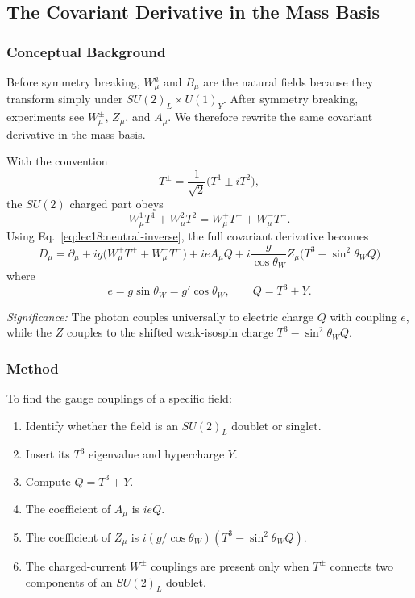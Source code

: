 \subsection{The Covariant Derivative in the Mass Basis}\label{subsec:lec18:covariant-derivative-mass-basis}

\subsubsection*{Conceptual Background}

Before symmetry breaking, $W^a_\mu$ and $B_\mu$ are the natural fields because
they transform simply under $SU(2)_L\times U(1)_Y$. After symmetry breaking,
experiments see $W^\pm_\mu$, $Z_\mu$, and $A_\mu$. We therefore rewrite the
same covariant derivative in the mass basis.

With the convention
\begin{equation}
  T^\pm=\frac{1}{\sqrt2}\big(T^1\pm iT^2\big),
  \label{eq:lec18:tpm-definition}
\end{equation}
the $SU(2)$ charged part obeys
\begin{equation}
  W^1_\mu T^1+W^2_\mu T^2=W^+_\mu T^+ + W^-_\mu T^- .
  \label{eq:lec18:charged-generator-identity}
\end{equation}
Using Eq.~\eqref{eq:lec18:neutral-inverse}, the full covariant derivative becomes
\begin{equation}
  \boxed{\;
  D_\mu=\partial_\mu
  +ig\big(W^+_\mu T^+ + W^-_\mu T^-\big)
  +ieA_\mu Q
  +i\frac{g}{\cos\theta_W}Z_\mu\big(T^3-\sin^2\theta_W Q\big)\;}
  \label{eq:lec18:covariant-derivative-mass-basis}
\end{equation}
where
\begin{equation}
  \boxed{\;e=g\sin\theta_W=g'\cos\theta_W,
  \qquad Q=T^3+Y .\;}
  \label{eq:lec18:e-charge-relation}
\end{equation}

\textit{Significance:} The photon couples universally to electric charge $Q$ with coupling $e$, while the $Z$ couples to the shifted weak-isospin charge $T^3-\sin^2\theta_W Q$.

\subsubsection*{Method}

To find the gauge couplings of a specific field:
\begin{enumerate}
  \item Identify whether the field is an $SU(2)_L$ doublet or singlet.
  \item Insert its $T^3$ eigenvalue and hypercharge $Y$.
  \item Compute $Q=T^3+Y$.
  \item The coefficient of $A_\mu$ is $ieQ$.
  \item The coefficient of $Z_\mu$ is $i(g/\cos\theta_W)(T^3-\sin^2\theta_W Q)$.
  \item The charged-current $W^\pm$ couplings are present only when $T^\pm$ connects two components of an $SU(2)_L$ doublet.
\end{enumerate}

